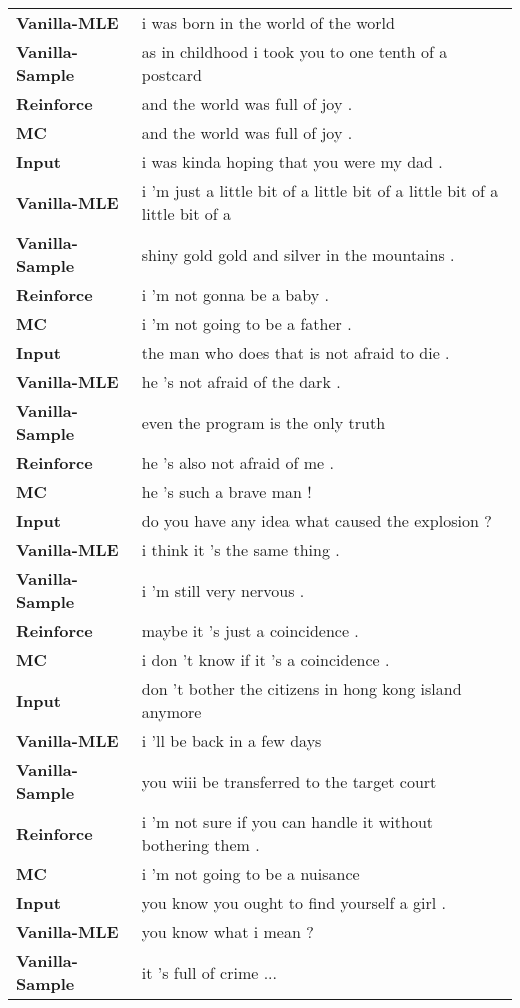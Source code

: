 \documentclass[11pt]{article}
\begin{document}
\begin{table*}[!htb]
\begin{tabular}{p{4cm}p{8cm}}
{\bf Vanilla-MLE}&i was born in the world of the world\\
{\bf Vanilla-Sample}&as in childhood i took you to one tenth of a postcard\\
{\bf Reinforce}&and the world was full of joy .\\
{\bf MC}&and the world was full of joy .\\\hline
{\bf Input}&i was kinda hoping that you were my dad .\\
{\bf Vanilla-MLE}&i 'm just a little bit of a little bit of a little bit of a little bit of a\\
{\bf Vanilla-Sample}&shiny gold gold and silver in the mountains .\\
{\bf Reinforce}&i 'm not gonna be a baby .\\
{\bf MC}&i 'm not going to be a father .\\\hline
{\bf Input}&the man who does that is not afraid to die .\\
{\bf Vanilla-MLE}&he 's not afraid of the dark .\\
{\bf Vanilla-Sample}&even the program is the only truth\\
{\bf Reinforce}&he 's also not afraid of me .\\
{\bf MC}&he 's such a brave man !\\\hline
{\bf Input}&do you have any idea what caused the explosion ?\\
{\bf Vanilla-MLE}&i think it 's the same thing .\\
{\bf Vanilla-Sample}&i 'm still very nervous .\\
{\bf Reinforce}&maybe it 's just a coincidence .\\
{\bf MC}&i don 't know if it 's a coincidence .\\\hline
{\bf Input}&don 't bother the citizens in hong kong island anymore\\
{\bf Vanilla-MLE}&i 'll be back in a few days\\
{\bf Vanilla-Sample}&you wiii be transferred to the target court\\
{\bf Reinforce}&i 'm not sure if you can handle it without bothering them .\\
{\bf MC}&i 'm not going to be a nuisance\\\hline
{\bf Input}&you know you ought to find yourself a girl .\\
{\bf Vanilla-MLE}&you know what i mean ?\\
{\bf Vanilla-Sample}&it 's full of crime ...\\

\end{tabular}
\end{table*}
\end{document}
